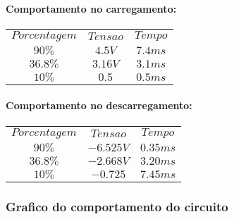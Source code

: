\documentclass[12pt,twoside, a4paper, twocolumn]{article}
\begin{document}
\paragraph*{Comportamento no carregamento:}
\begin{center}
    \begin{tabular}{ |ccc| }
        \hline
        $Porcentagem$ & $Tensao$ & $Tempo$ \\
        $90\%$        & $4.5V$   & $7.4ms$ \\
        $36.8\%$      & $3.16V$  & $3.1ms$ \\
        $10\%$        & $0.5$    & $0.5ms$ \\
        \hline
    \end{tabular}
\end{center}

\paragraph*{Comportamento no descarregamento:}
\begin{center}
    \begin{tabular}{ |ccc| }
        \hline
        $Porcentagem$ & $Tensao$  & $Tempo$  \\
        $90\%$        & $-6.525V$ & $0.35ms$ \\
        $36.8\%$      & $-2.668V$ & $3.20ms$ \\
        $10\%$        & $-0.725$  & $7.45ms$ \\
        \hline
    \end{tabular}
\end{center}

\subsubsection{Grafico do comportamento do circuito}
\end{document}
